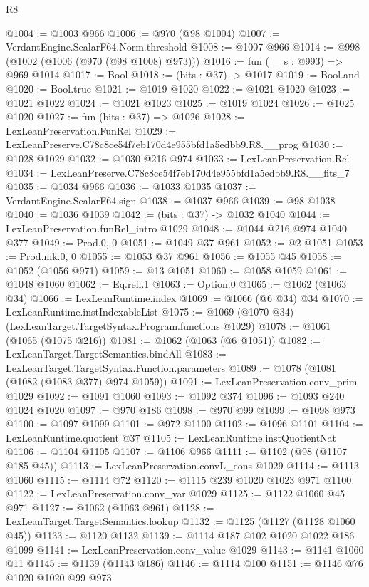 \begin{lexlean}{R8}
\begin{coremodule}
@1004 := @1003 @966
@1006 := @970 (@98 @1004)
@1007 := VerdantEngine.ScalarF64.Norm.threshold
@1008 := @1007 @966
@1014 := @998 (@1002 (@1006 (@970 (@98 @1008) @973)))
@1016 := fun (__s : @993) => @969 @1014
@1017 := Bool
@1018 := (bits : @37) -> @1017
@1019 := Bool.and
@1020 := Bool.true
@1021 := @1019 @1020
@1022 := @1021 @1020
@1023 := @1021 @1022
@1024 := @1021 @1023
@1025 := @1019 @1024
@1026 := @1025 @1020
@1027 := fun (bits : @37) => @1026
@1028 := LexLeanPreservation.FunRel
@1029 := LexLeanPreserve.C78c8ce54f7eb170d4e955bfd1a5edbb9.R8.__prog
@1030 := @1028 @1029
@1032 := @1030 @216 @974
@1033 := LexLeanPreservation.Rel
@1034 := LexLeanPreserve.C78c8ce54f7eb170d4e955bfd1a5edbb9.R8.__fits_7
@1035 := @1034 @966
@1036 := @1033 @1035
@1037 := VerdantEngine.ScalarF64.sign
@1038 := @1037 @966
@1039 := @98 @1038
@1040 := @1036 @1039
@1042 := (bits : @37) -> @1032 @1040
@1044 := LexLeanPreservation.funRel_intro @1029
@1048 := @1044 @216 @974 @1040 @377
@1049 := Prod.{0, 0}
@1051 := @1049 @37 @961
@1052 := @2 @1051
@1053 := Prod.mk.{0, 0}
@1055 := @1053 @37 @961
@1056 := @1055 @45
@1058 := @1052 (@1056 @971)
@1059 := @13 @1051
@1060 := @1058 @1059
@1061 := @1048 @1060
@1062 := Eq.refl.{1}
@1063 := Option.{0}
@1065 := @1062 (@1063 @34)
@1066 := LexLeanRuntime.index
@1069 := @1066 (@6 @34) @34
@1070 := LexLeanRuntime.instIndexableList
@1075 := @1069 (@1070 @34) (LexLeanTarget.TargetSyntax.Program.functions @1029)
@1078 := @1061 (@1065 (@1075 @216))
@1081 := @1062 (@1063 (@6 @1051))
@1082 := LexLeanTarget.TargetSemantics.bindAll
@1083 := LexLeanTarget.TargetSyntax.Function.parameters
@1089 := @1078 (@1081 (@1082 (@1083 @377) @974 @1059))
@1091 := LexLeanPreservation.conv_prim @1029
@1092 := @1091 @1060
@1093 := @1092 @374
@1096 := @1093 @240 @1024 @1020
@1097 := @970 @186
@1098 := @970 @99
@1099 := @1098 @973
@1100 := @1097 @1099
@1101 := @972 @1100
@1102 := @1096 @1101
@1104 := LexLeanRuntime.quotient @37
@1105 := LexLeanRuntime.instQuotientNat
@1106 := @1104 @1105
@1107 := @1106 @966
@1111 := @1102 (@98 (@1107 @185 @45))
@1113 := LexLeanPreservation.convL_cons @1029
@1114 := @1113 @1060
@1115 := @1114 @72
@1120 := @1115 @239 @1020 @1023 @971 @1100
@1122 := LexLeanPreservation.conv_var @1029
@1125 := @1122 @1060 @45 @971
@1127 := @1062 (@1063 @961)
@1128 := LexLeanTarget.TargetSemantics.lookup
@1132 := @1125 (@1127 (@1128 @1060 @45))
@1133 := @1120 @1132
@1139 := @1114 @187 @102 @1020 @1022 @186 @1099
@1141 := LexLeanPreservation.conv_value @1029
@1143 := @1141 @1060 @11
@1145 := @1139 (@1143 @186)
@1146 := @1114 @100
@1151 := @1146 @76 @1020 @1020 @99 @973

\end{coremodule}
\end{lexlean}
